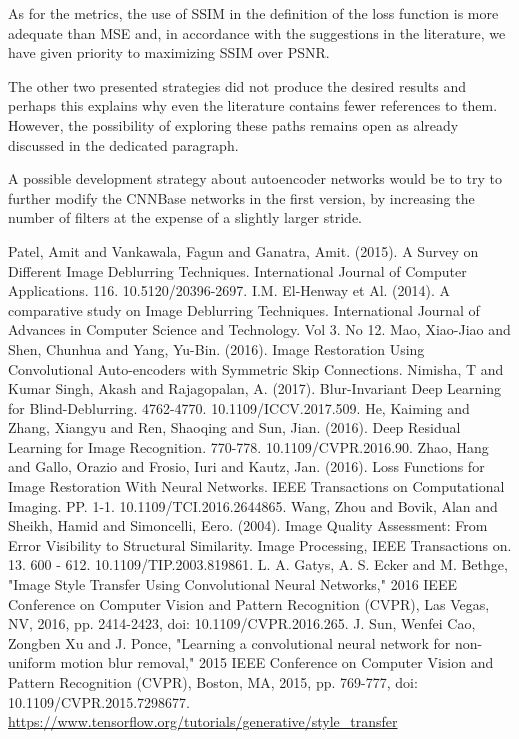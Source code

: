 \documentclass[12pt,a4paper]{report}
\begin{document}
As for the metrics, the use of SSIM in the definition of the loss function is more adequate than MSE and, in accordance with the suggestions in the literature, we have given priority to maximizing SSIM over PSNR.

The other two presented strategies did not produce the desired results and perhaps this explains why even the literature contains fewer references to them. However, the possibility of exploring these paths remains open as already discussed in the dedicated paragraph.


A possible development strategy about autoencoder networks would be to try to further modify the CNNBase networks in the first version, by increasing the number of filters at the expense of a slightly larger stride.

\newpage

\newpage
\begin{thebibliography}{99}
  Patel, Amit and Vankawala, Fagun and Ganatra, Amit. (2015). A Survey on Different Image Deblurring Techniques. International Journal of Computer Applications. 116. 10.5120/20396-2697. 
 I.M. El-Henway et Al. (2014). A comparative study on Image Deblurring Techniques. International Journal of Advances in Computer Science and Technology. Vol 3. No 12.
 Mao, Xiao-Jiao and Shen, Chunhua and Yang, Yu-Bin. (2016). Image Restoration Using Convolutional Auto-encoders with Symmetric Skip Connections. 
 Nimisha, T and Kumar Singh, Akash and Rajagopalan, A. (2017). Blur-Invariant Deep Learning for Blind-Deblurring. 4762-4770. 10.1109/ICCV.2017.509. 
 He, Kaiming and Zhang, Xiangyu and Ren, Shaoqing and Sun, Jian. (2016). Deep Residual Learning for Image Recognition. 770-778. 10.1109/CVPR.2016.90. 
 Zhao, Hang and Gallo, Orazio and Frosio, Iuri and Kautz, Jan. (2016). Loss Functions for Image Restoration With Neural Networks. IEEE Transactions on Computational Imaging. PP. 1-1. 10.1109/TCI.2016.2644865.
 Wang, Zhou and Bovik, Alan and Sheikh, Hamid and Simoncelli, Eero. (2004). Image Quality Assessment: From Error Visibility to Structural Similarity. Image Processing, IEEE Transactions on. 13. 600 - 612. 10.1109/TIP.2003.819861. 
 L. A. Gatys, A. S. Ecker and M. Bethge, "Image Style Transfer Using Convolutional Neural Networks," 2016 IEEE Conference on Computer Vision and Pattern Recognition (CVPR), Las Vegas, NV, 2016, pp. 2414-2423, doi: 10.1109/CVPR.2016.265.
 J. Sun, Wenfei Cao, Zongben Xu and J. Ponce, "Learning a convolutional neural network for non-uniform motion blur removal," 2015 IEEE Conference on Computer Vision and Pattern Recognition (CVPR), Boston, MA, 2015, pp. 769-777, doi: 10.1109/CVPR.2015.7298677.
 \url{https://www.tensorflow.org/tutorials/generative/style_transfer}

\end{thebibliography}
\end{document}
